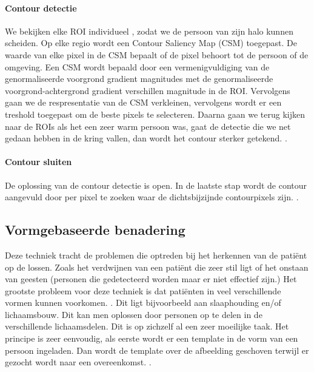 \paragraph{Contour detectie}
We bekijken elke ROI individueel , zodat we de persoon van zijn halo kunnen scheiden. Op elke regio wordt een Contour Saliency Map (CSM) toegepast. De waarde van elke pixel in de CSM bepaalt of de pixel behoort tot de persoon of de omgeving. Een CSM wordt bepaald door een vermenigvuldiging van de genormaliseerde voorgrond gradient magnitudes met de genormaliseerde voorgrond-achtergrond gradient verschillen magnitude in de ROI. Vervolgens gaan we de respresentatie van de CSM verkleinen, vervolgens wordt er een treshold toegepast om de beste pixels te selecteren. Daarna gaan we terug kijken naar de ROIs als het een zeer warm persoon was, gaat de detectie die we net gedaan hebben in de kring vallen, dan wordt het contour sterker getekend. \cite{bibBET5}.

\paragraph{Contour sluiten}
De oplossing van de contour detectie is open. In de laatste stap wordt de contour aangevuld door per pixel te zoeken waar de dichtsbijzijnde contourpixels zijn. \cite{bibBET5}.

\subsection{Vormgebaseerde benadering}
\label{refVBB}
Deze techniek tracht de problemen die optreden bij het herkennen van de pati\"ent op de lossen. Zoals het verdwijnen van een pati\"ent die zeer stil ligt of het onstaan van geesten (personen die gedetecteerd worden maar er niet effectief zijn.) Het grootste probleem voor deze techniek is dat pati\"enten in veel verschillende vormen kunnen voorkomen. \cite{bibIRC}. Dit ligt bijvoorbeeld aan slaaphouding en/of lichaamsbouw. Dit kan men oplossen door personen op te delen in de verschillende lichaamsdelen. Dit is op zichzelf al een zeer moeilijke taak.  
Het principe is zeer eenvoudig, als eerste wordt er een template in de vorm van een persoon ingeladen. Dan wordt de template over de afbeelding geschoven terwijl er gezocht wordt naar een overeenkomst. \cite{bibIRC4}.